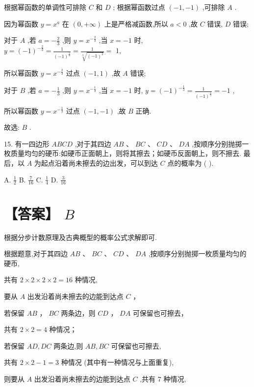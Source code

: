 \documentclass[10pt]{article}
\begin{document}
根据幂函数的单调性可排除 \(C\) 和 \(D\) ; 根据幂函数过点 \(\left( {-1, - 1}\right)\) ,可排除 \(A\) .

因为幂函数 \(y = {x}^{a}\) 在 \(\left( {0, + \infty }\right)\) 上是严格减函数,所以 \(a < 0\) ,故 \(C\) 错误, \(D\) 错误;

对于 \(A\) ,若 \(a =  - \frac{2}{3}\) ,则 \(y = {x}^{-\frac{2}{3}}\) ,当 \(x =  - 1\) 时, \(y = {\left( -1\right) }^{-\frac{2}{3}} = \frac{1}{{\left( -1\right) }^{\frac{2}{3}}} = \frac{1}{\sqrt[3]{{\left( -1\right) }^{2}}} =\) 1,

所以幂函数 \(y = {x}^{-\frac{2}{3}}\) 过点 \(\left( {-1,1}\right)\) ,故 \(A\) 错误;

对于 \(B\) ,若 \(a =  - \frac{1}{3}\) ,则 \(y = {x}^{-\frac{1}{3}}\) ,当 \(x =  - 1\) 时, \(y = {\left( -1\right) }^{-\frac{1}{3}} = \frac{1}{{\left( -1\right) }^{\frac{1}{3}}} =  - 1\) ,

所以幂函数 \(y = {x}^{-\frac{1}{3}}\) 过点 \(\left( {-1, - 1}\right)\) ,故 \(B\) 正确.

故选: \(B\) .

15. 有一四边形 \({ABCD}\) ,对于其四边 \({AB}\text{ 、 }{BC}\text{ 、 }{CD}\text{ 、 }{DA}\) ,按顺序分别抛掷一枚质量均匀的硬币:如硬币正面朝上，则将其擦去；如硬币反面朝上，则不擦去. 最后，以 \(A\) 为起点沿着尚未擦去的边出发，可以到达 \(C\) 点的概率为 ( ).

A. \(\frac{1}{2}\) B. \(\frac{7}{16}\) C. \(\frac{1}{4}\) D. \(\frac{3}{16}\)

\section*{【答案】 \(B\)}

根据分步计数原理及古典概型的概率公式求解即可.

根据题意,对于其四边 \({AB}\text{ 、 }{BC}\text{ 、 }{CD}\text{ 、 }{DA}\) ,按顺序分别抛掷一枚质量均匀的硬币,

共有 \(2 \times  2 \times  2 \times  2 = {16}\) 种情况,

要从 \(A\) 出发沿着尚未擦去的边能到达点 \(C\) ，

若保留 \({AB}\) ， \({BC}\) 两条边，则 \({CD}\) ， \({DA}\) 可保留也可擦去，

共有 \(2 \times  2 = 4\) 种情况；

若保留 \({AD},{DC}\) 两条边,则 \({AB},{BC}\) 可保留也可擦去,

共有 \(2 \times  2 - 1 = 3\) 种情况 (其中有一种情况与上面重复),

则要从 \(A\) 出发沿着尚未擦去的边能到达点 \(C\) ,共有 7 种情况,
\end{document}
